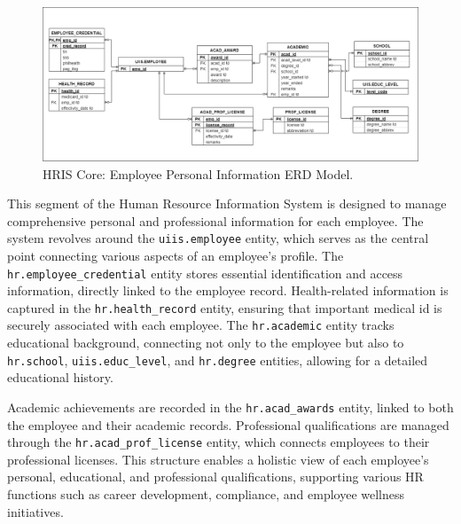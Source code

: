     \begin{figure}[H]
        \centering
        \includegraphics[width=1\linewidth]{figures/images/diagrams/erd/erd-core-emp-personal-info.png}
        \caption{HRIS Core: Employee Personal Information ERD Model.}
        \label{fig:erd-core-emp-personal-info}
    \end{figure}

    This segment of the Human Resource Information System is designed to manage comprehensive personal and professional information for each employee. The system revolves around the \texttt{uiis.employee} entity, which serves as the central point connecting various aspects of an employee's profile. The \texttt{hr.employee\_credential} entity stores essential identification and access information, directly linked to the employee record. Health-related information is captured in the \texttt{hr.health\_record} entity, ensuring that important medical id is securely associated with each employee. The \texttt{hr.academic} entity tracks educational background, connecting not only to the employee but also to \texttt{hr.school}, \texttt{uiis.educ\_level}, and \texttt{hr.degree} entities, allowing for a detailed educational history. 
            
    Academic achievements are recorded in the \texttt{hr.acad\_awards} entity, linked to both the employee and their academic records. Professional qualifications are managed through the \texttt{hr.acad\_prof\_license} entity, which connects employees to their professional licenses. This structure enables a holistic view of each employee's personal, educational, and professional qualifications, supporting various HR functions such as career development, compliance, and employee wellness initiatives.

